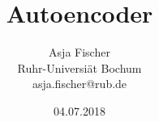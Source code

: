 \documentclass[11pt,mathserif]{beamer}
\title[]{Autoencoder}
\author{
  Asja Fischer \\
  Ruhr-Universi\"at Bochum\\
  asja.fischer@rub.de 
}
\date{04.07.2018}
\begin{document}
\frame{\titlepage}

%
%
%

\end{document}
